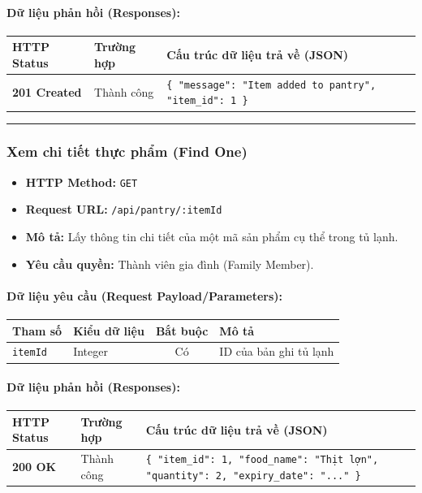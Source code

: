 \documentclass[12pt,a4paper]{article}
\begin{document}
\paragraph{Dữ liệu phản hồi (Responses):}
\begin{longtable}{|p{2.8cm}|p{3.2cm}|p{8.0cm}|}
\hline
\textbf{HTTP Status} & \textbf{Trường hợp} & \textbf{Cấu trúc dữ liệu trả về (JSON)} \\ \hline
\endhead
\textbf{201 Created} & Thành công & \texttt{\{ "message": "Item added to pantry", "item\_id": 1 \}} \\ \hline
\end{longtable}

\vskip 0.4cm
\noindent\rule{\textwidth}{0.3pt}
\vskip 0.4cm

\subsubsection{Xem chi tiết thực phẩm (Find One)}
\begin{itemize}[leftmargin=*]
    \item \textbf{HTTP Method:} \texttt{GET}
    \item \textbf{Request URL:} \texttt{/api/pantry/:itemId}
    \item \textbf{Mô tả:} Lấy thông tin chi tiết của một mã sản phẩm cụ thể trong tủ lạnh.
    \item \textbf{Yêu cầu quyền:} Thành viên gia đình (Family Member).
\end{itemize}

\paragraph{Dữ liệu yêu cầu (Request Payload/Parameters):}
\begin{longtable}{|p{2.8cm}|p{2.2cm}|c|p{7.0cm}|}
\hline
\textbf{Tham số} & \textbf{Kiểu dữ liệu} & \textbf{Bắt buộc} & \textbf{Mô tả} \\ \hline
\endhead
\texttt{itemId} & Integer & Có & ID của bản ghi tủ lạnh \\ \hline
\end{longtable}

\paragraph{Dữ liệu phản hồi (Responses):}
\begin{longtable}{|p{2.8cm}|p{3.2cm}|p{8.0cm}|}
\hline
\textbf{HTTP Status} & \textbf{Trường hợp} & \textbf{Cấu trúc dữ liệu trả về (JSON)} \\ \hline
\endhead
\textbf{200 OK} & Thành công & \texttt{\{ "item\_id": 1, "food\_name": "Thịt lợn", "quantity": 2, "expiry\_date": "..." \}} \\ \hline
\end{longtable}
\end{document}
